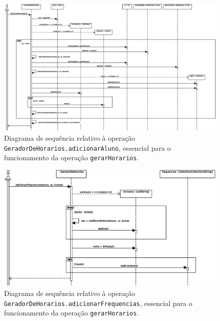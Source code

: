 \documentclass[12pt, a4paper]{article}
\begin{document}
\begin{landscape}
        \begin{figure}[H]
            \centering
            \includegraphics[scale=0.60]{Imagens/Modelos/gerarHorariosAdicionarAluno.svg.eps}
            \caption{
                Diagrama de sequência relativo à operação \texttt{GeradorDeHorarios.adicionarAluno},
                essencial para o funcionamento da operação \texttt{gerarHorarios}.
            }
        \end{figure}

        \vspace*{\fill}
        \pagebreak
        \vspace*{\fill}

        \begin{figure}[H]
            \centering
            \includegraphics[scale=1.0]{Imagens/Modelos/gerarHorariosAdicionarFrequencias.svg.eps}
            \caption{
                Diagrama de sequência relativo à operação \texttt{GeradorDeHorarios.adicionarFrequencias},
                essencial para o funcionamento da operação \texttt{gerarHorarios}.
            }
        \end{figure}


\end{landscape}
\end{document}

